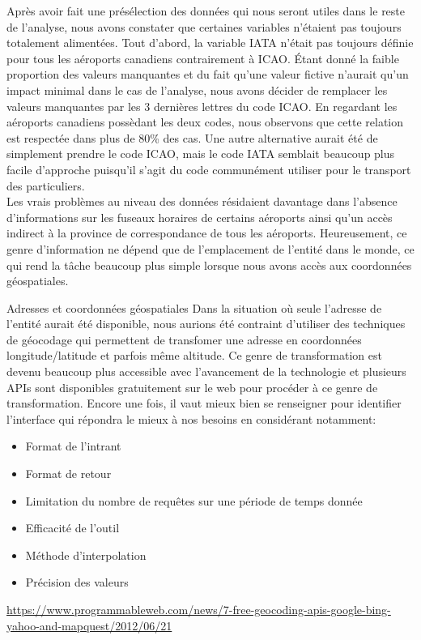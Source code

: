 \noindent
Après avoir fait une présélection des données qui nous seront utiles dans le reste de l'analyse, nous avons constater que certaines variables n'étaient pas toujours totalement alimentées. Tout d'abord, la variable IATA n'était pas toujours définie pour tous les aéroports canadiens contrairement à ICAO. Étant donné la faible proportion des valeurs manquantes et du fait qu'une valeur fictive n'aurait qu'un impact minimal dans le cas de l'analyse, nous avons décider de remplacer les valeurs manquantes par les 3 dernières lettres du code ICAO. En regardant les aéroports canadiens possèdant les deux codes, nous observons que cette relation est respectée dans plus de 80\% des cas. Une autre alternative aurait été de simplement prendre le code ICAO, mais le code IATA semblait beaucoup plus facile d'approche puisqu'il s'agit du code communément utiliser pour le transport des particuliers. \\

\noindent
Les vrais problèmes au niveau des données résidaient davantage dans l'absence d'informations sur les fuseaux horaires de certains aéroports ainsi qu'un accès indirect à la province de correspondance de tous les aéroports. Heureusement, ce genre d'information ne dépend que de l'emplacement de l'entité dans le monde, ce qui rend la tâche beaucoup plus simple lorsque nous avons accès aux coordonnées géospatiales. \\

\begin{moreInfo}{Adresses et coordonnées géospatiales}
	Dans la situation où seule l'adresse de l'entité aurait été disponible, nous aurions été contraint d'utiliser des techniques de géocodage qui permettent de transfomer une adresse en coordonnées longitude/latitude et parfois même altitude. Ce genre de transformation est devenu beaucoup plus accessible avec l'avancement de la technologie et plusieurs APIs sont disponibles gratuitement sur le web pour procéder à ce genre de transformation. Encore une fois, il vaut mieux bien se renseigner pour identifier l'interface qui répondra le mieux à nos besoins en considérant notamment:
	\begin{itemize}
		\item Format de l'intrant
		\item Format de retour
		\item Limitation du nombre de requêtes sur une période de temps donnée
		\item Efficacité de l'outil
		\item Méthode d'interpolation
		\item Précision des valeurs
	\end{itemize}
	\url{https://www.programmableweb.com/news/7-free-geocoding-apis-google-bing-yahoo-and-mapquest/2012/06/21}
\end{moreInfo}

